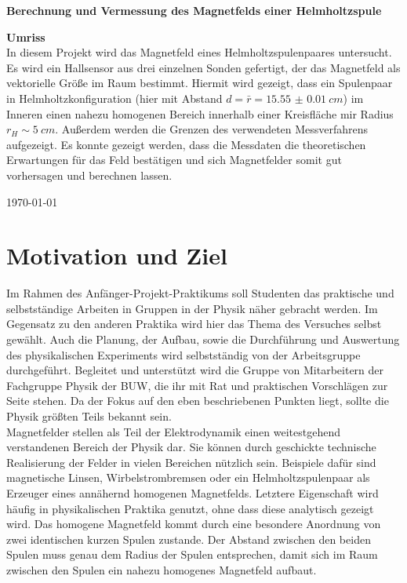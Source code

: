 \documentclass[12pt,a4paper]{article}
\begin{document}
\begin{titlepage}
\begin{center}
			{ \textbf{\huge Berechnung und Vermessung des Magnetfelds einer Helmholtzspule}}\\[1.5cm]
			\end{center}
		\textbf{Umriss}\\
		In diesem Projekt wird das Magnetfeld eines Helmholtzspulenpaares untersucht. Es wird ein Hallsensor aus drei einzelnen Sonden gefertigt, der das Magnetfeld als vektorielle Größe im Raum bestimmt. Hiermit wird gezeigt, dass ein Spulenpaar in Helmholtzkonfiguration (hier mit Abstand $d=\bar{r}= \SI{15.55(1)}{cm}$) im Inneren einen nahezu homogenen Bereich innerhalb einer Kreisfläche mir Radius $r_H\sim \SI{5}{cm}$. Außerdem werden die Grenzen des verwendeten Messverfahrens aufgezeigt. Es konnte gezeigt werden, dass die Messdaten die theoretischen Erwartungen für das Feld bestätigen und sich Magnetfelder somit gut vorhersagen und berechnen lassen.
			\vfill
		\begin{center}	
			{\large\today}
		\end{center}
	\end{titlepage}
	
	\setcounter{tocdepth}{2}
	\tableofcontents
	\thispagestyle{empty}
	\newpage
	

\section{Motivation und Ziel}
Im Rahmen des Anfänger-Projekt-Praktikums soll Studenten das praktische und selbstständige Arbeiten in Gruppen in der Physik näher gebracht werden. Im Gegensatz zu den anderen Praktika wird hier das Thema des Versuches selbst gewählt. Auch die Planung, der Aufbau, sowie die Durchführung und Auswertung des physikalischen Experiments wird selbstständig von der Arbeitsgruppe durchgeführt. Begleitet und unterstützt wird die Gruppe von Mitarbeitern der Fachgruppe Physik der BUW, die ihr mit Rat und praktischen Vorschlägen zur Seite stehen. Da der Fokus auf den eben beschriebenen Punkten liegt, sollte die Physik größten Teils bekannt sein.\\ 

Magnetfelder stellen als Teil der Elektrodynamik einen weitestgehend verstandenen Bereich der Physik dar. Sie können durch geschickte technische Realisierung der Felder in vielen Bereichen nützlich sein. Beispiele dafür sind magnetische Linsen, Wirbelstrombremsen oder ein Helmholtzspulenpaar als Erzeuger eines annähernd homogenen Magnetfelds. Letztere Eigenschaft wird häufig in physikalischen Praktika genutzt, ohne dass diese analytisch gezeigt wird. Das homogene Magnetfeld kommt durch eine besondere Anordnung von zwei identischen kurzen Spulen zustande. Der Abstand zwischen den beiden Spulen muss genau dem Radius der Spulen entsprechen, damit sich im Raum zwischen den Spulen ein nahezu homogenes Magnetfeld aufbaut. \\ 
\end{document}
